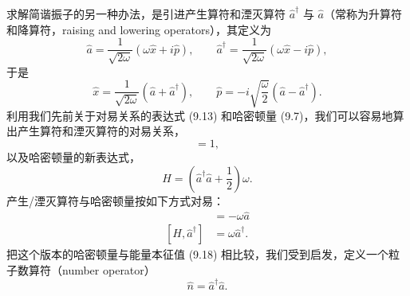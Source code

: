 求解简谐振子的另一种办法，是引进产生算符和湮灭算符 $\hat{a}^{\dagger}$ 与 $\hat{a}$（常称为升算符和降算符，raising and lowering operators），其定义为
\begin{equation*}
\hat{a} = \frac{1}{\sqrt{2\omega}}\left(\omega\hat{x} + i\hat{p}\right), \qquad \hat{a}^{\dagger} = \frac{1}{\sqrt{2\omega}}\left(\omega\hat{x} - i\hat{p}\right),
\tag{9.21}
\end{equation*}
于是
\begin{equation*}
\hat{x} = \frac{1}{\sqrt{2\omega}}(\hat{a} + \hat{a}^{\dagger}), \qquad \hat{p} = -i\sqrt{\frac{\omega}{2}}(\hat{a} - \hat{a}^{\dagger}).
\tag{9.22}
\end{equation*}
利用我们先前关于对易关系的表达式 (9.13) 和哈密顿量 (9.7)，我们可以容易地算出产生算符和湮灭算符的对易关系，
\begin{equation*}
[\hat{a}, \hat{a}^{\dagger}] = 1,
\tag{9.23}
\end{equation*}
以及哈密顿量的新表达式，
\begin{equation*}
H = \left(\hat{a}^{\dagger}\hat{a} + \frac{1}{2}\right)\omega.
\tag{9.24}
\end{equation*}
产生/湮灭算符与哈密顿量按如下方式对易：
\begin{align*}
[H, \hat{a}] &= -\omega\hat{a} \\
[H, \hat{a}^{\dagger}] &= \omega\hat{a}^{\dagger}.
\tag{9.25}
\end{align*}
把这个版本的哈密顿量与能量本征值 (9.18) 相比较，我们受到启发，定义一个粒子数算符（number operator）
\begin{equation*}
\hat{n} = \hat{a}^{\dagger}\hat{a}.
\tag{9.26}
\end{equation*}

